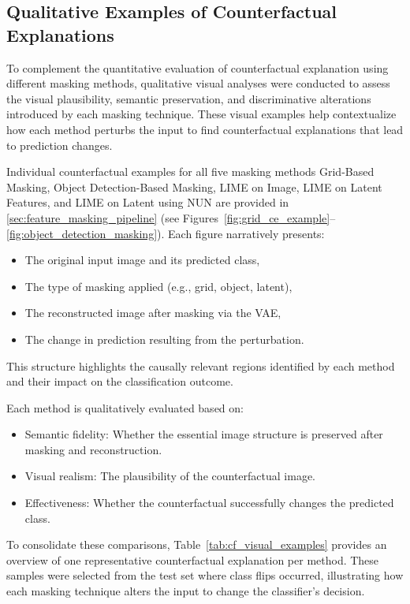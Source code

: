 \subsection{Qualitative Examples of Counterfactual Explanations} \label{subsubsec:qualitative_examples}
To complement the quantitative evaluation of counterfactual explanation using different masking methods, qualitative visual analyses were conducted to assess the visual plausibility, semantic preservation, and discriminative alterations introduced by each masking technique. These visual examples help contextualize how each method perturbs the input to find counterfactual explanations that lead to prediction changes.

Individual counterfactual examples for all five masking methods Grid-Based Masking, Object Detection-Based Masking, LIME on Image, LIME on Latent Features, and LIME on Latent using NUN are provided in \cref{sec:feature_masking_pipeline} (see Figures~\ref{fig:grid_ce_example}--\ref{fig:object_detection_masking}). Each figure narratively presents:

\begin{itemize}
    \item The original input image and its predicted class,
    \item The type of masking applied (e.g., grid, object, latent),
    \item The reconstructed image after masking via the VAE,
    \item The change in prediction resulting from the perturbation.
\end{itemize}

This structure highlights the causally relevant regions identified by each method and their impact on the classification outcome.

Each method is qualitatively evaluated based on:
\begin{itemize}
    \item Semantic fidelity: Whether the essential image structure is preserved after masking and reconstruction.
    \item Visual realism: The plausibility of the counterfactual image.
    \item Effectiveness: Whether the counterfactual successfully changes the predicted class.
\end{itemize}

\vspace{0.5em}

To consolidate these comparisons, Table~\ref{tab:cf_visual_examples} provides an overview of one representative counterfactual explanation per method. These samples were selected from the test set where class flips occurred, illustrating how each masking technique alters the input to change the classifier's decision.

